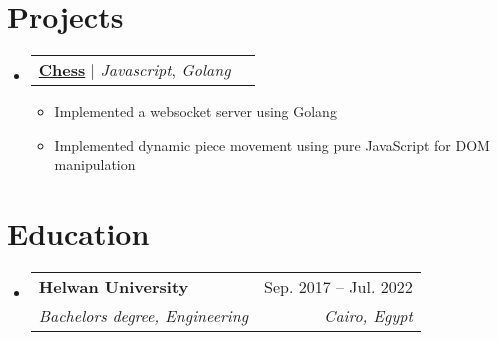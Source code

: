 \documentclass[letterpaper,11pt]{article}
\makeatletter
\newcommand{\resumeItem}[1]{
  \item\small{
    {#1 \vspace{-2pt}}
  }
}
\newcommand{\resumeSubheading}[4]{
  \vspace{-2pt}\item
    \begin{tabular*}{0.97\textwidth}[t]{l@{\extracolsep{\fill}}r}
      \textbf{#1} & #2 \\
      \textit{\small#3} & \textit{\small #4} \\
    \end{tabular*}\vspace{-7pt}
}
\newcommand{\resumeProjectHeading}[2]{
    \item
    \begin{tabular*}{0.97\textwidth}{l@{\extracolsep{\fill}}r}
      \small#1 & #2 \\
    \end{tabular*}\vspace{-7pt}
}
\newcommand{\resumeSubHeadingListStart}{\begin{itemize}[leftmargin=0.15in, label={}]}
\newcommand{\resumeSubHeadingListEnd}{\end{itemize}}
\newcommand{\resumeItemListStart}{\begin{itemize}}
\newcommand{\resumeItemListEnd}{\end{itemize}\vspace{-5pt}}
\makeatother
\begin{document}
    \section{Projects}
    \resumeSubHeadingListStart
      \resumeProjectHeading
          {\href{https://github.com/se-omar/chess}{\textbf{Chess}} $|$ \emph{Javascript}, \emph{Golang}}{}
          \resumeItemListStart
            \resumeItem{Implemented a websocket server using Golang}
            \resumeItem{Implemented dynamic piece movement using pure JavaScript for DOM manipulation}
          \resumeItemListEnd

    \resumeSubHeadingListEnd




\section{Education}
  \resumeSubHeadingListStart
    \resumeSubheading
      {Helwan University}{Sep. 2017 -- Jul. 2022}
      {Bachelors degree, Engineering}{Cairo, Egypt}
\resumeSubHeadingListEnd
\end{document}
